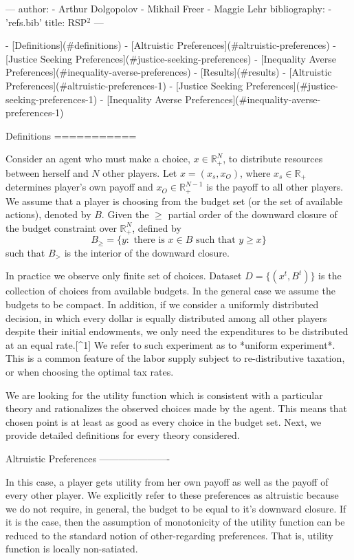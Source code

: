 ---
author:
- Arthur Dolgopolov
- Mikhail Freer
- Maggie Lehr
bibliography:
- 'refs.bib'
title: RSP$^2$
---

-   [Definitions](#definitions)
    -   [Altruistic Preferences](#altruistic-preferences)
    -   [Justice Seeking Preferences](#justice-seeking-preferences)
    -   [Inequality Averse Preferences](#inequality-averse-preferences)
-   [Results](#results)
    -   [Altruistic Preferences](#altruistic-preferences-1)
    -   [Justice Seeking Preferences](#justice-seeking-preferences-1)
    -   [Inequality Averse
        Preferences](#inequality-averse-preferences-1)

Definitions
===========

Consider an agent who must make a choice, $x\in {\mathbb{R}}^N_+$, to 
distribute resources between herself and $N$ other players. Let
$x = (x_s,x_O)$, where $x_s\in {\mathbb{R}}_+$ determines player’s own
payoff and $x_O \in {\mathbb{R}}^{N-1}_+$ is the payoff to all other
players. We assume that a player is choosing from the budget set (or the
set of available actions), denoted by $B$. Given the $\geq$ partial order of the 
downward closure of the budget constraint over ${\mathbb{R}}^N_+$, defined by
$$B_{\geq} = \{y: \text{ there is } x\in B \text{ such that } y \geq x\}$$
such that $B_{>}$ is the interior of the downward closure.

In practice we observe only finite set of choices. Dataset
$D=\{(x^t,B^t)\}$ is the collection of choices from available budgets. In the
general case we assume the budgets to be compact. In addition, if
we consider a uniformly distributed decision, in which every dollar is
equally distributed among all other players despite their initial endowments,
we only need the expenditures to be distributed at an equal rate.[^1] 
We refer to such experiment as to *uniform
experiment*. This is a common feature of the labor supply
subject to re-distributive taxation, or when choosing the optimal tax rates.

We are looking for the utility function which is consistent 
with a particular theory and rationalizes the observed choices made 
by the agent. This means that chosen point is at least as good as 
every choice in the budget set. Next, we
provide detailed definitions for every theory considered.

Altruistic Preferences
----------------------

In this case, a player gets utility from her own payoff as well as the payoff of
every other player. We explicitly refer to these preferences as
altruistic because we do not require, in general, the budget to be equal to
it’s downward closure. If it is the case, then the assumption of
monotonicity of the utility function can be reduced to the standard
notion of other-regarding preferences. That is, utility function is 
locally non-satiated.

